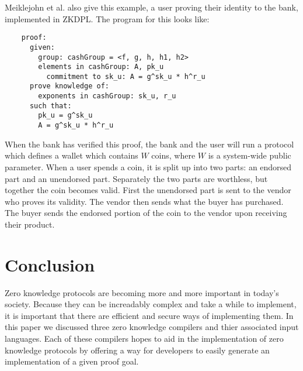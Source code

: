\documentclass{sig-alternate}
\begin{document}
	Meiklejohn et al. also give this example, a user proving their identity to the bank,
	implemented in ZKDPL. The program for this looks like: 
	\begin{verbatim}
	proof:
	  given:
	  	group: cashGroup = <f, g, h, h1, h2>
	  	elements in cashGroup: A, pk_u
	  	  commitment to sk_u: A = g^sk_u * h^r_u
	  prove knowledge of:
	  	exponents in cashGroup: sk_u, r_u
	  such that:
	  	pk_u = g^sk_u
	  	A = g^sk_u * h^r_u
	\end{verbatim}
	
	When the bank has verified this proof, the bank and the user will run a protocol
	which defines a wallet which contains $W$ coins, where $W$ is a system-wide
	public parameter. When a user spends a coin, it is split up into two parts: an
	endorsed part and an unendorsed part. Separately the two parts are worthless, but
	together the coin becomes valid. First the unendorsed part is sent to the vendor
	who proves its validity. The vendor then sends what the buyer has purchased. The
	buyer sends the endorsed portion of the coin to the vendor upon receiving their
	product.

\section{Conclusion}
	Zero knowledge protocols are becoming more and more important in today's society. 
	Because they can be increadably complex and take a while to implement, it is important 
	that there are efficient and secure ways of implementing them. In this paper we discussed
	three zero knowledge compilers and thier associated input languages. Each of these compilers
	hopes to aid in the implementation of zero knowledge protocols by offering a way for
	developers to easily generate an implementation of a given proof goal. 




\end{document}
